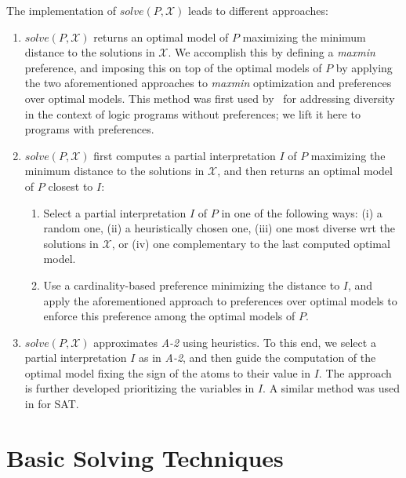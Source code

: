 \documentclass[a4paper,USenglish]{oasics-v2016}
\begin{document}
The implementation of $\mathit{solve}(P,\mathcal{X})$ leads to different approaches:
%
\begin{enumerate}[label={\textcolor{darkgray}{\sffamily\bfseries\mathversion{bold}{A-\arabic*}}}.]
\item $\mathit{solve}(P,\mathcal{X})$ returns an optimal model of $P$ maximizing the minimum distance to the solutions in 
    $\mathcal{X}$.
%
  We accomplish this by defining a \textit{maxmin} preference, %
  and imposing this on top of the optimal models of $P$ 
  by applying the two aforementioned approaches to \emph{maxmin} optimization and preferences over optimal models.
  This method was first used by~\cite{eiererfi13a} for addressing diversity in the context of logic programs without preferences;
  we lift it here to programs with preferences.
  
\item $\mathit{solve}(P,\mathcal{X})$ first computes a partial interpretation $I$ of $P$ maximizing the minimum distance to the solutions in  $\mathcal{X}$, 
  and then returns an optimal model of $P$ closest to $I$:
  \begin{enumerate}
  \item Select a partial interpretation $I$ of $P$ in one of the following ways:
%
(i) %
    a random one,
(ii) %
    a heuristically chosen one, %
(iii) %
    one most diverse wrt the solutions in $\mathcal{X}$, or 
(iv) %
    one complementary to the last computed optimal model.%
  \item Use a cardinality-based preference minimizing the distance to $I$, and
    apply the aforementioned approach to preferences over optimal models to enforce this preference among the optimal models of $P$.
  \end{enumerate}
  
\item $\mathit{solve}(P,\mathcal{X})$ approximates \emph{A-2} using heuristics. %
  To this end, we select a partial interpretation $I$ as in \emph{A-2}, 
  and then guide the computation of the optimal model fixing the sign of the atoms to their value in $I$. 
  The approach is further developed prioritizing the variables in $I$.
  A similar method was used in \cite{nadel11a} for SAT.
\end{enumerate}

 \section{Basic Solving Techniques}\label{sec:basic}
\end{document}
